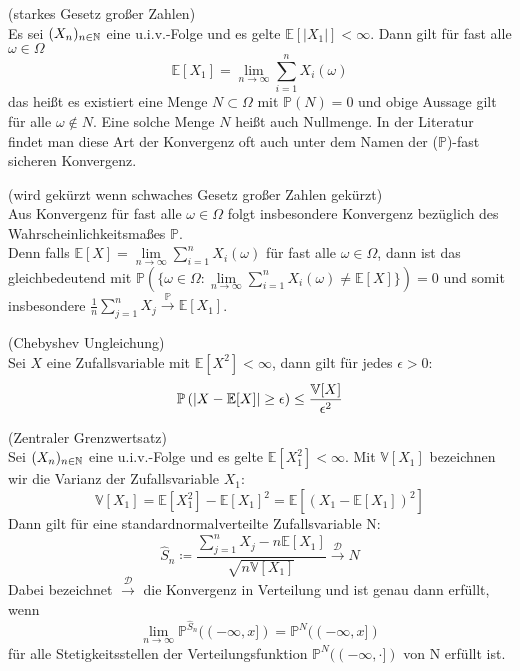 \begin{Satz}(starkes Gesetz großer Zahlen)\\
	\label{starkesGgZ}
	Es sei $ (X_n)_{n \in \mathbb{N}} $ eine u.i.v.-Folge und es gelte $ \mathbb{E}[|X_1|] < \infty$. Dann gilt für fast alle $ \omega  \in \Omega$ 
	\[
		\mathbb{E}[X_1] = \lim_{n \to \infty} \sum_{i=1}^n X_i(\omega)
	\]
	das heißt es existiert eine Menge $ N \subset \Omega $ mit $ \mathbb{P}(N)=0 $ und obige Aussage gilt für alle $ \omega \not \in N $. Eine solche Menge $ N $ heißt auch Nullmenge. In der Literatur findet man diese Art der Konvergenz oft auch unter dem Namen der ($\mathbb{P}$)-fast sicheren Konvergenz.
\end{Satz} 
\begin{Bemerkung}(wird gekürzt wenn schwaches Gesetz großer Zahlen gekürzt)\\
	Aus Konvergenz für fast alle $ \omega \in \Omega $ folgt insbesondere Konvergenz bezüglich des Wahrscheinlichkeitsmaßes $ \mathbb{P} $.\\
	 Denn falls $ \mathbb{E}[X] = \lim\limits_{n \to \infty} \sum_{i=1}^n X_i(\omega) $ für fast alle $ \omega \in \Omega $, dann ist das gleichbedeutend mit $ \mathbb{P}(\{ \omega \in \Omega:  \lim\limits_{n \to \infty} \sum_{i=1}^n X_i(\omega) \not = \mathbb{E}[X] \}) = 0 $ und somit insbesondere $ \frac{1}{n} \sum_{j=1}^n X_j \stackrel{\mathbb{P}}{\to} \mathbb{E}[X_1] $.
\end{Bemerkung}
\begin{Satz}(Chebyshev Ungleichung)\\
	\label{ChebCheb}
	Sei $ X  $ eine Zufallsvariable mit $ \mathbb{E}[X^2] < \infty $, dann gilt für jedes $ \epsilon > 0 $:
	\[
	\mathbb{P}\left( | X-\mathbb{E}[X] | \geq \epsilon \right) \leq \frac{\mathbb{V}[X]}{\epsilon^2}
	\]
\end{Satz}
\begin{Satz}(Zentraler Grenzwertsatz)\\
	\label{ZGWS}
	Sei $ (X_n)_{n \in \mathbb{N}} $ eine u.i.v.-Folge und es gelte $ \mathbb{E}[X_1^2] < \infty $.
	Mit $ \mathbb{V}[X_1] $ bezeichnen wir die Varianz der Zufallsvariable $ X_1 $:
	\[
		\mathbb{V}[X_1] = \mathbb{E}[X_1^2]-\mathbb{E}[X_1]^2 = \mathbb{E}[(X_1-\mathbb{E}[X_1])^2]
	\]
	Dann gilt für eine standardnormalverteilte Zufallsvariable N:
	\[
		\hat{S}_n \coloneqq\frac{\sum_{j=1}^{n}X_j-n\mathbb{E}[X_1]}{\sqrt{n\mathbb{V}[X_1]}} \stackrel{\mathcal{D}}{\to} N
	\]
	Dabei bezeichnet $ \stackrel{\mathcal{D}}{\to} $ die Konvergenz in Verteilung und ist genau dann erfüllt, wenn 
	\[ \lim\limits_{n \to \infty} \mathbb{P}^{\hat{S}_n}((-\infty,x]) = \mathbb{P}^N((-\infty,x])
	\]
	für alle Stetigkeitsstellen der Verteilungsfunktion $ \mathbb{P}^N((-\infty,\cdot]) $ von N erfüllt ist.
\end{Satz}


